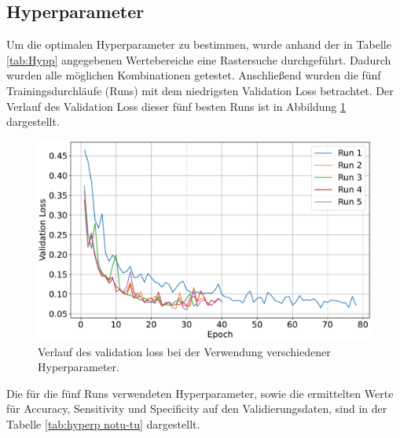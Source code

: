 \subsection{Hyperparameter}
Um die optimalen Hyperparameter zu bestimmen, wurde anhand der in Tabelle \ref{tab:Hypp} angegebenen Wertebereiche eine Rastersuche durchgeführt.
Dadurch wurden alle möglichen Kombinationen getestet.
Anschließend wurden die fünf Trainingsdurchläufe (Runs) mit dem niedrigsten Validation Loss betrachtet.
Der Verlauf des Validation Loss dieser fünf besten Runs ist in Abbildung \ref{fig:val_loss notu-tu} dargestellt.
\begin{figure}[H]
  \centering
  \includegraphics[scale=0.3]{plots/Val_loss_noTu_Tu.pdf}
  \caption{Verlauf des validation loss bei der Verwendung verschiedener Hyperparameter.}
  \label{fig:val_loss notu-tu}
\end{figure}
\vspace{-2em}
Die für die fünf Runs verwendeten Hyperparameter, sowie die ermittelten Werte für Accuracy, Sensitivity und Specificity auf den Validierungsdaten,
sind in der Tabelle \ref{tab:hyperp notu-tu} dargestellt.
\begin{table}[H]
    \centering
  \caption{Die fünf Runs mit dem niedrigsten validation loss sowie deren verwendete Hyperparameter und aufgezeichnete Metriken.}
  \label{tab:hyperp notu-tu}
\end{table}
